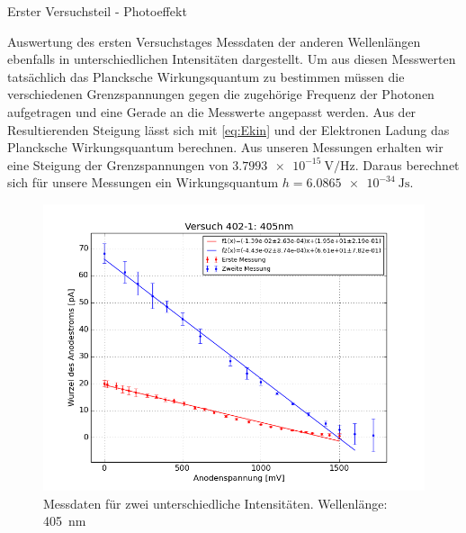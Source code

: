 \documentclass[pdftex, a4paper,11pt, twoside, ngerman]{report}
\begin{document}
\begin{chapter}{Erster Versuchsteil - Photoeffekt}
\begin{section}{Auswertung des ersten Versuchstages}
      Messdaten der anderen Wellenlängen ebenfalls in unterschiedlichen 
      Intensitäten dargestellt. Um aus diesen Messwerten tatsächlich das 
      Plancksche Wirkungsquantum zu bestimmen müssen die verschiedenen 
      Grenzspannungen gegen die zugehörige Frequenz der Photonen aufgetragen 
      und eine Gerade an die Messwerte angepasst werden. Aus der 
      Resultierenden Steigung lässt sich mit \cref{eq:Ekin} und der Elektronen 
      Ladung das Plancksche Wirkungsquantum berechnen. Aus unseren Messungen 
      erhalten wir eine Steigung der Grenzspannungen von 
      $\SI{3.7993e-15}{\volt\per\hertz}$. Daraus berechnet sich für unsere 
      Messungen ein Wirkungsquantum $h=\SI{6.0865e-34}{\joule\second}$. 
      
      \begin{figure}[htbp]
        \centering
        \begin{minipage}{0.48\textwidth}
          \centering
          \includegraphics[width=\textwidth]{Figures/Versuch402_1_405.png}
          \caption{Messdaten für zwei unterschiedliche Intensitäten. 
              Wellenlänge: \SI{405}{\nano\meter}}
          \label{fig:Versuch402_1_405}
        \end{minipage}\quad
        \begin{minipage}{0.48\textwidth}
          \centering

\end{minipage}
\end{figure}
\end{section}
\end{chapter}
\end{document}
